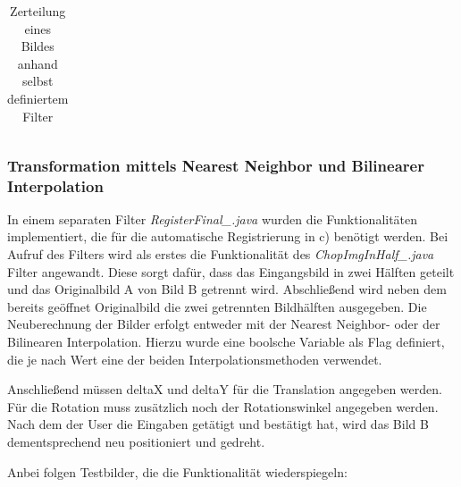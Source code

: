 \documentclass[12pt,german]{article}
\begin{document}
\begin{table}[H]
\begin{tabular}{| c | c | c |}
  \end{tabular}
  \caption{Zerteilung eines Bildes anhand selbst definiertem Filter}
  \label{tab:chopInHalfTest}
\end{table}






\subsubsection{Transformation mittels Nearest Neighbor und Bilinearer Interpolation}

In einem separaten Filter \textit{RegisterFinal\_.java} wurden die Funktionalitäten implementiert, die für die automatische Registrierung in c) benötigt werden. Bei Aufruf des Filters wird als erstes die Funktionalität des \textit{ChopImgInHalf\_.java} Filter angewandt. Diese sorgt dafür, dass das Eingangsbild in zwei Hälften geteilt und das Originalbild A von Bild B getrennt wird. Abschließend wird neben dem bereits geöffnet Originalbild die zwei getrennten Bildhälften ausgegeben. Die Neuberechnung der Bilder erfolgt entweder mit der Nearest Neighbor- oder der Bilinearen Interpolation. Hierzu wurde eine boolsche Variable als Flag definiert, die je nach Wert eine der beiden Interpolationsmethoden verwendet.

Anschließend müssen deltaX und deltaY für die Translation angegeben werden. Für die Rotation muss zusätzlich noch der Rotationswinkel angegeben werden. Nach dem der User die Eingaben  getätigt und bestätigt hat, wird das Bild B dementsprechend neu positioniert und gedreht.

Anbei folgen Testbilder, die die Funktionalität wiederspiegeln:
\end{document}
